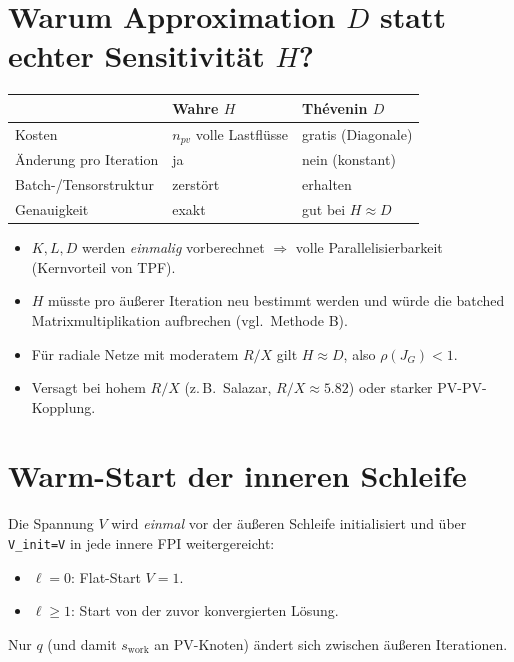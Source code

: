\documentclass[11pt]{article}
\begin{document}
	\section{Warum Approximation $D$ statt echter Sensitivität $H$?}
	\begin{table}[h]
		\centering
		\begin{tabular}{lll}
			\toprule
			& Wahre $H$ & Thévenin $D$ \\
			\midrule
			Kosten & $n_{pv}$ volle Lastflüsse & gratis (Diagonale) \\
			Änderung pro Iteration & ja & nein (konstant) \\
			Batch-/Tensorstruktur & zerstört & erhalten \\
			Genauigkeit & exakt & gut bei $H \approx D$ \\
			\bottomrule
		\end{tabular}
	\end{table}
	\begin{itemize}
		\item $K, L, D$ werden \emph{einmalig} vorberechnet $\Rightarrow$ volle
		Parallelisierbarkeit (Kernvorteil von TPF).
		\item $H$ müsste pro äußerer Iteration neu bestimmt werden und würde die
		batched Matrixmultiplikation aufbrechen (vgl.\ Methode B).
		\item Für radiale Netze mit moderatem $R/X$ gilt $H \approx D$,
		also $\rho(J_G) < 1$.
		\item Versagt bei hohem $R/X$ (z.\,B.\ Salazar, $R/X \approx 5.82$)
		oder starker PV-PV-Kopplung.
	\end{itemize}
	
	\section{Warm-Start der inneren Schleife}
	Die Spannung $V$ wird \emph{einmal} vor der äußeren Schleife initialisiert
	und über \texttt{V\_init=V} in jede innere FPI weitergereicht:
	\begin{itemize}
		\item $\ell=0$: Flat-Start $V=1$.
		\item $\ell \geq 1$: Start von der zuvor konvergierten Lösung.
	\end{itemize}
	Nur $q$ (und damit $s_{\text{work}}$ an PV-Knoten) ändert sich zwischen
	äußeren Iterationen.
	
\end{document}

